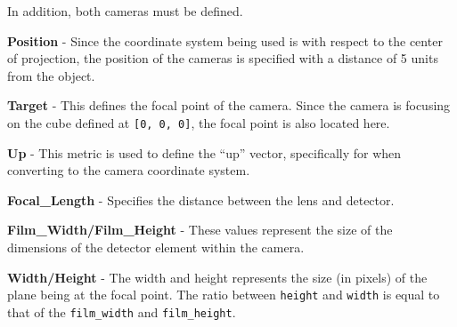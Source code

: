 \documentclass[11pt]{article}
\begin{document}
    In addition, both cameras must be defined.

\textbf{Position} - Since the coordinate system being used is with
respect to the center of projection, the position of the cameras is
specified with a distance of 5 units from the object.

\textbf{Target} - This defines the focal point of the camera. Since the
camera is focusing on the cube defined at \texttt{{[}0,\ 0,\ 0{]}}, the
focal point is also located here.

\textbf{Up} - This metric is used to define the ``up'' vector,
specifically for when converting to the camera coordinate system.

\textbf{Focal\_Length} - Specifies the distance between the lens and
detector.

\textbf{Film\_Width/Film\_Height} - These values represent the size of
the dimensions of the detector element within the camera.

\textbf{Width/Height} - The width and height represents the size (in
pixels) of the plane being at the focal point. The ratio between
\texttt{height} and \texttt{width} is equal to that of the
\texttt{film\_width} and \texttt{film\_height}.
\end{document}
